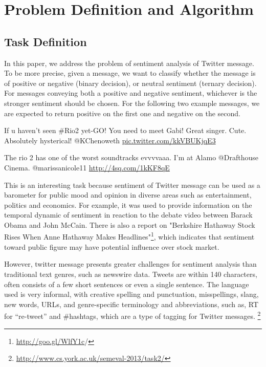\section{Problem Definition and Algorithm}
\label{sec:def}

\subsection{Task Definition}
In this paper, we address the problem of sentiment analysis of Twitter message. To be more precise, 
given a message, we want to classify whether the message is of positive or negative (binary decision), or neutral sentiment (ternary decision). For messages conveying both a positive and negative sentiment, whichever is the stronger sentiment should be chosen. For the following two example messages, we are expected to return positive on the first one and negative on the second. 
\begin{mdframed}[
  leftmargin=\parindent,
  rightmargin=\parindent,
  skipabove=\topsep,
  skipbelow=\topsep
  ]
  If u haven't seen \#Rio2 yet-GO! You need to meet Gabi! Great singer. Cute. Absolutely hysterical! @KChenoweth \url{pic.twitter.com/kkVBUKjqE3}
\end{mdframed}

\begin{mdframed}[
  leftmargin=\parindent,
  rightmargin=\parindent,
  skipabove=\topsep,
  skipbelow=\topsep
  ]
 The rio 2 has one of the worst soundtracks evvvvaaa. I'm at Alamo @Drafthouse Cinema. @marissanicole11 \url{http://4sq.com/1kKF8qE} 
\end{mdframed}

This is an interesting task because sentiment of Twitter message can be used as a barometer for public mood and opinion in diverse areas such as entertainment, politics and economics. For example, 
it was used to provide information on the temporal dynamic of sentiment in reaction to the debate video between Barack Obama and John McCain\cite{Diakopoulos:2010}. 
There is also a report on "Berkshire Hathaway Stock Rises When Anne Hathaway Makes Headlines"\footnote{\url{http://goo.gl/WlfY1c}/}, which indicates that sentiment toward public figure may have potential influence over stock market. 

However, twitter message presents greater challenges for sentiment analysis than traditional text genres, such as newswire data.  Tweets are within 140 characters, often consists of a few short sentences or even a single sentence. 
The language used is very informal, with creative spelling and punctuation, misspellings, slang, new words, URLs, and genre-specific terminology and abbreviations, such as, RT for “re-tweet” and \#hashtags, which are a type of tagging for Twitter messages. \footnote{\url{http://www.cs.york.ac.uk/semeval-2013/task2/}}


